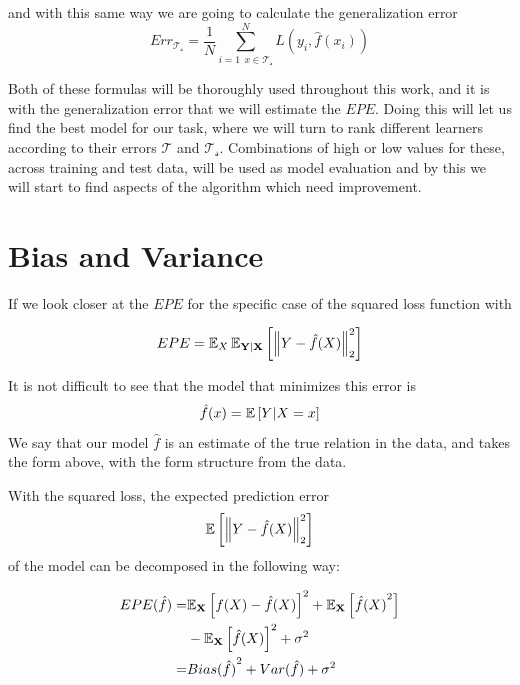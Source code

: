 and with this same way we are going to calculate the generalization error
\begin{equation}
Err_{\mathcal{T_s}} = \frac{1}{N} \sum_{i=1 \ \ x \in \mathcal{T_s} }^N L(y_i, \hat{f}(x_i) )
\label{eq:generalizationErrorCalculation}
\end{equation}

Both of these formulas will be thoroughly used throughout this work, and it is with the generalization error that we will estimate the $EPE$.
Doing this will let us find the best model for our task, where we will turn to rank different learners according to their errors $\mathcal{T}$ and $\mathcal{T_s}$.
Combinations of high or low values for these, across training and test data, will be used as model evaluation and by this we will start to find aspects of the algorithm which need improvement.


\section{Bias and Variance}\label{section-biasVariance}

If we look closer at the $EPE$ for the specific case of the squared loss function with

\begin{equation}\label{squaredPE}
EPE = \operatorname{\mathbb{E}}_X \operatorname{\mathbb{E}}_{\textbf{Y}|\textbf{X}} \left[ \left\Vert Y - \hat{f}(X) \right\Vert_2^2 \right]
\end{equation}

It is not difficult to see that the model that minimizes this error is
$$\hat{f}(x) = \operatorname{\mathbb{E}} \left[ Y | X=x \right] $$
We say that our model $\hat{f}$ is an estimate of the true relation in the data, and takes the form above, with the form structure from the data.

With the squared loss, the expected prediction error
$$\operatorname{\mathbb{E}} \left[ \left\Vert Y - \hat{f}(X) \right\Vert_2^2 \right]$$
of the model can be decomposed in the following way:

\begin{equation}\label{squaredBiasDecomposition}
\begin{split}
EPE( \hat{f} ) = & {\operatorname{\mathbb{E}}_{\textbf{X}} \left[  f(X) - \hat{f}(X) \right]}^2 + \operatorname{\mathbb{E}}_{\textbf{X}} \left[ {\hat{f}(X)}^2 \right] \\
& - {\operatorname{\mathbb{E}}_{\textbf{X}} \left[ \hat{f}(X) \right] }^2 + \sigma^2 \\
= & {Bias(\hat{f})}^2 + Var(\hat{f}) + \sigma^2
\end{split}
\end{equation}


